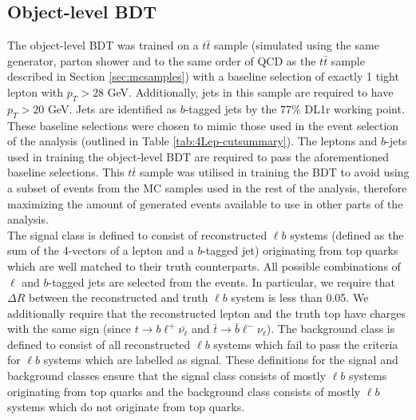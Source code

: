 \subsection{Object-level BDT}
\label{sec:object-level-bdt}
The object-level BDT was trained on a $t\bar{t}$ sample (simulated using the same generator, parton shower and to the same order of QCD as the $t\bar{t}$ sample described in Section \ref{sec:mcsamples}) with a baseline selection of exactly 1 tight lepton with $p_{T} > 28$ GeV. Additionally, jets in this sample are required to have $p_{T} > 20$ GeV. Jets are identified as $b$-tagged jets by the $77\%$ DL1r working point. These baseline selections were chosen to mimic those used in the event selection of the analysis (outlined in Table \ref{tab:4Lep-cutsummary}). The leptons and $b$-jets used in training the object-level BDT are required to pass the aforementioned baseline selections. This $t\bar{t}$ sample was utilised in training the BDT to avoid using a subset of events from the MC samples used in the rest of the analysis, therefore maximizing the amount of generated events available to use in other parts of the analysis.\\

The signal class is defined to consist of reconstructed $\ell b$ systems (defined as the sum of the 4-vectors of a lepton and a $b$-tagged jet) originating from top quarks which are well matched to their truth counterparts. All possible combinations of $\ell$ and $b$-tagged jets are selected from the events. In particular, we require that $\Delta R$ between the reconstructed and truth $\ell b$ system is less than 0.05. We additionally require that the reconstructed lepton and the truth top have charges with the same sign (since $t\rightarrow b\ell^{+}\bar{\nu_{\ell}}$ and $\bar{t}\rightarrow \bar{b}\ell^{-}\nu_{\ell}$). The background class is defined to consist of all reconstructed $\ell b$ systems which fail to pass the criteria for $\ell b$ systems which are labelled as signal. These definitions for the signal and background classes ensure that the signal class consists of mostly $\ell b$ systems originating from top quarks and the background class consists of mostly $\ell b$ systems which do not originate from top quarks.\\

